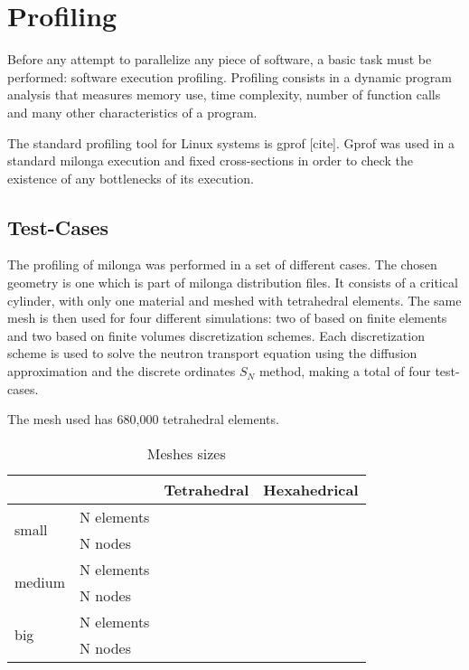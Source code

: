 \documentclass{anstrans}
\begin{document}
\section{Profiling}
Before any attempt to parallelize any piece of software, a basic task must be performed:
software execution profiling. Profiling consists in a dynamic program analysis
that measures memory use, time complexity, number of function calls and many other characteristics of
a program.

The standard profiling tool for Linux systems is gprof [cite]. Gprof was used in a standard milonga
execution
and fixed cross-sections in order to check
the existence of any bottlenecks of its execution.

\subsection{Test-Cases}

The profiling of milonga was performed in a set of different cases. The chosen geometry is one which is part of
milonga distribution files. It consists of a critical cylinder, with only one material and meshed with
tetrahedral elements. The same mesh is then used for four different simulations: two of based on
finite elements and two based on finite volumes discretization schemes. Each discretization scheme is used
to solve the neutron transport equation using the diffusion approximation and the discrete ordinates $S_N$ method,
making a total of four test-cases.

The mesh used has 680,000 tetrahedral elements.

\begin{table}[]
\centering
\caption{Meshes sizes}
\label{tab:sizes}
\begin{tabular}{@{}llll@{}}
\toprule
                        &            & Tetrahedral & Hexahedrical \\ \midrule
\multirow{2}{*}{small}  & N elements &               &              \\
                        & N nodes    &               &              \\
\multirow{2}{*}{medium} & N elements &               &              \\
                        & N nodes    &               &              \\
\multirow{2}{*}{big}    & N elements &               &              \\
                        & N nodes    &               &              \\ \cmidrule(l){2-4} 
\end{tabular}
\end{table}
\end{document}
